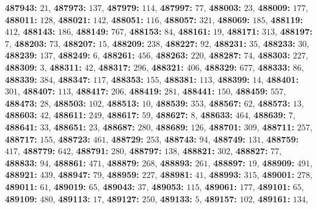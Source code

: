 \textsf{\bfseries 487943:} $21$, \textsf{\bfseries 487973:} $137$, \textsf{\bfseries 487979:} $114$, \textsf{\bfseries 487997:} $77$, \textsf{\bfseries 488003:} $23$, \textsf{\bfseries 488009:} $177$, \textsf{\bfseries 488011:} $128$, \textsf{\bfseries 488021:} $142$, \textsf{\bfseries 488051:} $116$, \textsf{\bfseries 488057:} $321$, \textsf{\bfseries 488069:} $185$, \textsf{\bfseries 488119:} $412$, \textsf{\bfseries 488143:} $186$, \textsf{\bfseries 488149:} $767$, \textsf{\bfseries 488153:} $84$, \textsf{\bfseries 488161:} $19$, \textsf{\bfseries 488171:} $313$, \textsf{\bfseries 488197:} $7$, \textsf{\bfseries 488203:} $73$, \textsf{\bfseries 488207:} $15$, \textsf{\bfseries 488209:} $238$, \textsf{\bfseries 488227:} $92$, \textsf{\bfseries 488231:} $35$, \textsf{\bfseries 488233:} $30$, \textsf{\bfseries 488239:} $137$, \textsf{\bfseries 488249:} $6$, \textsf{\bfseries 488261:} $456$, \textsf{\bfseries 488263:} $220$, \textsf{\bfseries 488287:} $74$, \textsf{\bfseries 488303:} $227$, \textsf{\bfseries 488309:} $3$, \textsf{\bfseries 488311:} $42$, \textsf{\bfseries 488317:} $296$, \textsf{\bfseries 488321:} $406$, \textsf{\bfseries 488329:} $677$, \textsf{\bfseries 488333:} $86$, \textsf{\bfseries 488339:} $384$, \textsf{\bfseries 488347:} $117$, \textsf{\bfseries 488353:} $155$, \textsf{\bfseries 488381:} $113$, \textsf{\bfseries 488399:} $14$, \textsf{\bfseries 488401:} $301$, \textsf{\bfseries 488407:} $113$, \textsf{\bfseries 488417:} $206$, \textsf{\bfseries 488419:} $281$, \textsf{\bfseries 488441:} $150$, \textsf{\bfseries 488459:} $557$, \textsf{\bfseries 488473:} $28$, \textsf{\bfseries 488503:} $102$, \textsf{\bfseries 488513:} $10$, \textsf{\bfseries 488539:} $353$, \textsf{\bfseries 488567:} $62$, \textsf{\bfseries 488573:} $13$, \textsf{\bfseries 488603:} $42$, \textsf{\bfseries 488611:} $249$, \textsf{\bfseries 488617:} $59$, \textsf{\bfseries 488627:} $8$, \textsf{\bfseries 488633:} $464$, \textsf{\bfseries 488639:} $7$, \textsf{\bfseries 488641:} $33$, \textsf{\bfseries 488651:} $23$, \textsf{\bfseries 488687:} $280$, \textsf{\bfseries 488689:} $126$, \textsf{\bfseries 488701:} $309$, \textsf{\bfseries 488711:} $257$, \textsf{\bfseries 488717:} $155$, \textsf{\bfseries 488723:} $461$, \textsf{\bfseries 488729:} $253$, \textsf{\bfseries 488743:} $94$, \textsf{\bfseries 488749:} $131$, \textsf{\bfseries 488759:} $417$, \textsf{\bfseries 488779:} $642$, \textsf{\bfseries 488791:} $280$, \textsf{\bfseries 488797:} $138$, \textsf{\bfseries 488821:} $302$, \textsf{\bfseries 488827:} $77$, \textsf{\bfseries 488833:} $94$, \textsf{\bfseries 488861:} $471$, \textsf{\bfseries 488879:} $268$, \textsf{\bfseries 488893:} $261$, \textsf{\bfseries 488897:} $19$, \textsf{\bfseries 488909:} $491$, \textsf{\bfseries 488921:} $439$, \textsf{\bfseries 488947:} $79$, \textsf{\bfseries 488959:} $227$, \textsf{\bfseries 488981:} $41$, \textsf{\bfseries 488993:} $315$, \textsf{\bfseries 489001:} $278$, \textsf{\bfseries 489011:} $61$, \textsf{\bfseries 489019:} $65$, \textsf{\bfseries 489043:} $37$, \textsf{\bfseries 489053:} $115$, \textsf{\bfseries 489061:} $177$, \textsf{\bfseries 489101:} $65$, \textsf{\bfseries 489109:} $480$, \textsf{\bfseries 489113:} $17$, \textsf{\bfseries 489127:} $250$, \textsf{\bfseries 489133:} $5$, \textsf{\bfseries 489157:} $102$, \textsf{\bfseries 489161:} $134$, 
